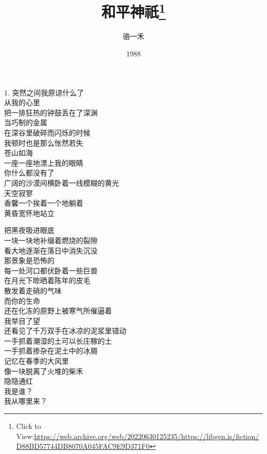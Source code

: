 \documentclass{article}
\title{和平神祇\footnote{Click to View:\url{https://web.archive.org/web/20220630125235/https://libgen.is/fiction/D88BD57744DB8070A045FAC9E9D371F0}}}
\author{骆一禾}
\date{1988}
\begin{document}

\maketitle

\setlength\parindent{0pt}


\Large

﻿1. 突然之间我原谅什么了\\
从我的心里
\\
把一排狂热的钟鼓丢在了深渊 \\ 


当巧制的金属\\
在深谷里破碎而闪烁的时候\\
我顿时也是那么怅然若失\\
苍山如海
\\
一座一座地漂上我的眼睛 \\ 


你什么都没有了\\
广阔的沙漠间横卧着一线模糊的黄光\\
天空寂寥\\
香馨一个挨着一个地躺着\\
黄昏宽怀地站立\\
\newpage

把黑夜吸进眼底
\\
一块一块地补缀着燃烧的裂隙 \\ 


看大地逐渐在落日中消失沉没\\
那景象是恐怖的\\
每一处河口都伏卧着一些巨兽\\
在月光下晾晒着陈年的皮毛
\\
散发着走硝的气味 \\ 


而你的生命\\
还在化冻的原野上被寒气所催逼着\\
我举目了望\\
还看见了千万双手在冰凉的泥浆里错动\\
一手抓着潮湿的土可以长庄稼的土\\
一手抓着掺杂在泥土中的冰屑\\
记忆在春季的大风里\\
像一块脱离了火堆的柴禾
\\
隐隐通红 \\ 


我是谁？\\
我从哪里来？\\
\newpage
\end{document}

